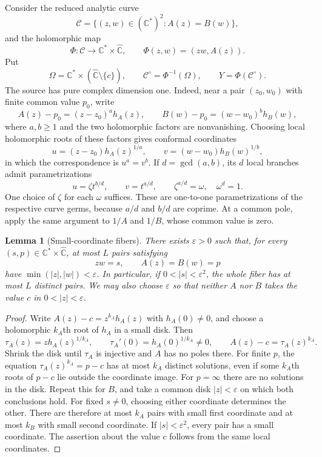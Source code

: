 \documentclass[11pt,reqno]{amsart}
\newtheorem{lemma}[theorem]{Lemma}
\theoremstyle{remark}
\numberwithin{equation}{section}
\newcommand{\C}{\mathbb C}
\newcommand{\Cs}{\C^*}
\newcommand{\Ps}{\widehat{\C}}
\begin{document}
Consider the reduced analytic curve
\[
 \mathcal C=\{(z,w)\in(\Cs)^2:A(z)=B(w)\},
\]
and the holomorphic map
\begin{equation}\label{eq:Phi}
 \Phi:\mathcal C\longrightarrow\Cs\times\Ps,
 \qquad \Phi(z,w)=(zw,A(z)).
\end{equation}
Put
\[
 \Omega=\Cs\times(\Ps\setminus\{c\}),
 \qquad \mathcal C^\circ=\Phi^{-1}(\Omega),
 \qquad Y=\Phi(\mathcal C^\circ).
\]
The source has pure complex dimension one. Indeed, near a pair
$(z_0,w_0)$ with finite common value $p_0$, write
\[
 A(z)-p_0=(z-z_0)^a h_A(z),\qquad
 B(w)-p_0=(w-w_0)^b h_B(w),
\]
where $a,b\ge1$ and the two holomorphic factors are nonvanishing.
Choosing local holomorphic roots of these factors gives conformal
coordinates
\[
 u=(z-z_0)h_A(z)^{1/a},\qquad
 v=(w-w_0)h_B(w)^{1/b},
\]
in which the correspondence is $u^a=v^b$. If $d=\gcd(a,b)$, its
$d$ local branches admit parametrizations
\[
 u=\zeta t^{b/d},\qquad v=t^{a/d},\qquad
 \zeta^{a/d}=\omega,\quad \omega^d=1.
\]
One choice of $\zeta$ for each $\omega$ suffices. These are
one-to-one parametrizations of the respective curve germs, because
$a/d$ and $b/d$ are coprime. At a common pole, apply the same
argument to $1/A$ and $1/B$, whose common value is zero.

\begin{lemma}[Small-coordinate fibers]\label{lem:small}
There exists $\varepsilon>0$ such that, for every
$(s,p)\in\Cs\times\Ps$, at most $L$
pairs satisfying
\begin{equation}\label{eq:pairs}
 zw=s,\qquad A(z)=B(w)=p
\end{equation}
have $\min(|z|,|w|)<\varepsilon$. In particular, if
$0<|s|<\varepsilon^2$, the whole fiber has at most $L$ distinct pairs.
We may also choose $\varepsilon$ so that neither $A$ nor $B$ takes the
value $c$ in $0<|z|<\varepsilon$.
\end{lemma}

\begin{proof}
Write $A(z)-c=z^{k_A}h_A(z)$ with $h_A(0)\ne0$, and choose a
holomorphic $k_A$th root of $h_A$ in a small disk. Then
\[
 \tau_A(z)=z h_A(z)^{1/k_A},\qquad
 \tau_A'(0)=h_A(0)^{1/k_A}\ne0,\qquad
 A(z)-c=\tau_A(z)^{k_A}.
\]
Shrink the disk until $\tau_A$ is injective and $A$ has no poles
there. For finite $p$, the equation $\tau_A(z)^{k_A}=p-c$ has at
most $k_A$ distinct solutions, even if some $k_A$th roots of $p-c$
lie outside the coordinate image. For $p=\infty$ there are no
solutions in the disk. Repeat this for $B$, and take a common disk
$|z|<\varepsilon$ on which both conclusions hold.
For fixed $s\ne0$, choosing either coordinate determines the other.
There are therefore at most $k_A$ pairs with small first coordinate and
at most $k_B$ with small second coordinate. If
$|s|<\varepsilon^2$, every pair has a small coordinate. The assertion
about the value $c$ follows from the same local coordinates.
\end{proof}
\end{document}
